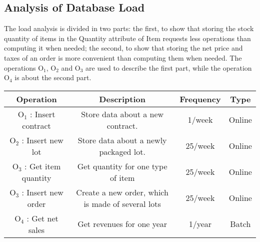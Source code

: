 \newpage
\subsection{Analysis of Database Load}
The load analysis is divided in two parts: the first, to show that storing the stock quantity of items in the Quantity attribute of Item requests less operations than computing it when needed; the second, to show that storing the net price and taxes of an order is more convenient than computing them when needed.
The operations $ \textrm{O}_\textrm{1} $, $ \textrm{O}_\textrm{2} $ and $ \textrm{O}_\textrm{3} $ are used to describe the first part, while the operation $ \textrm{O}_\textrm{4} $ is about the second part.

\begin{table}[!h]
	\begin{center}
		\begin{tabular}{ | c | c | c | c | }
			\hline
			\textbf{Operation} & \textbf{Description} & \textbf{Frequency} & \textbf{Type} \\ \hline
			$ \textrm{O}_\textrm{1} $ : Insert contract & Store data about a new contract. & 1/week & Online \\ \hline
			$ \textrm{O}_\textrm{2} $ : Insert new lot & Store data about a newly packaged lot. & 25/week & Online \\ \hline
			$ \textrm{O}_\textrm{3} $ : Get item quantity  & Get quantity for one type of item & 25/week & Online \\\hline
			$ \textrm{O}_\textrm{3} $ : Insert new order  & Create a new order, which is made of several lots & 25/week & Online \\\hline
			$ \textrm{O}_\textrm{4} $ : Get net sales  & Get revenues for one year & 1/year & Batch \\\hline
		\end{tabular}
	\end{center}
\end{table}


